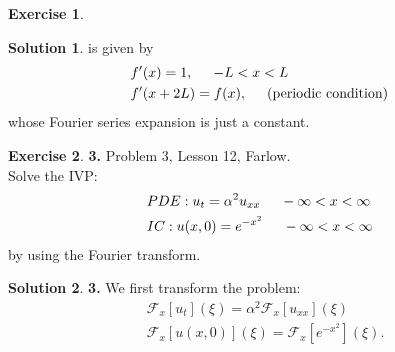 \documentclass{book}
\theoremstyle{definition}
\newtheorem*{exer*}{Exercise}
\newtheorem*{sln*}{Solution}
\newcommand{\F}{\mathcal{F}}
\newcommand{\lb}{\left[}
\newcommand{\rb}{\right]}
\begin{document}
\begin{exer*}
\begin{sln*}
	is given by
	\begin{align*}
	&f'(x) = 1, \hspace{0.5cm}-L < x < L\\
	&f'(x+2L) = f(x), \hspace{0.5cm} \text{(periodic condition)}
	\end{align*}
	whose Fourier series expansion is just a constant. 
	\end{sln*}
\end{exer*}

\newpage

\begin{exer*}\textbf{3. }Problem 3, Lesson 12, Farlow.\\
	
	Solve the IVP:
	\begin{align*}
	&PDE: u_t = \alpha^2 u_{xx}\hspace{0.5cm} -\infty < x < \infty \\
	&IC: u(x,0) = e^{-x^2} \hspace{0.5cm} -\infty < x < \infty
	\end{align*}
	by using the Fourier transform.
	
	\begin{sln*}\textbf{3. }
		We first transform the problem:
		\begin{align*}
		&\F_x[u_t](\xi) = \alpha^2 \F_x[u_{xx}](\xi)\\
		&\F_x[u(x,0)](\xi) = \F_x\lb e^{-x^2} \rb(\xi).
		\end{align*}
		

\end{sln*}
\end{exer*}
\end{document}
